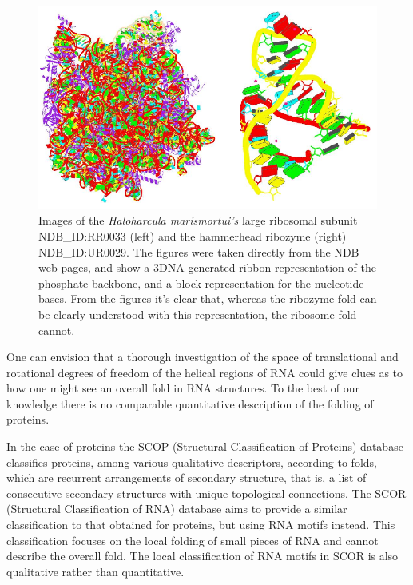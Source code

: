 \begin{figure}[t]
\centering
\includegraphics[scale=0.5]{Chapter1/ribosome_ribozyme.png}
\caption{Images   of  the  \textit{Haloharcula   marismortui's}  large
  ribosomal subunit NDB\_ID:RR0033 (left) and the hammerhead ribozyme
  (right) NDB\_ID:UR0029.
  The  figures were taken directly  from the NDB
  web  pages,   and  show  a  3DNA   generated  \cite{lu2008b}  ribbon
  representation of the phosphate backbone, and a block representation
  for the nucleotide bases. From  the figures it's clear that, whereas
  the   ribozyme   fold   can   be  clearly   understood   with   this
  representation, the ribosome fold cannot.}
\label{fig:ribosome}
\end{figure}

One  can  envision that  a  thorough  investigation  of the  space  of
translational and rotational degrees of freedom of the helical regions
of RNA could give clues as to  how one might see an overall fold in RNA
structures.  To the  best  of  our knowledge  there  is no  comparable
quantitative description of the folding of proteins.

In  the  case  of  proteins  the SCOP  (Structural  Classification  of
Proteins)  database  \cite{andreeva2004}  classifies  proteins,  among
various  qualitative  descriptors,   according  to  folds,  which  are
recurrent  arrangements of  secondary structure,  that is,  a  list of
consecutive secondary structures  with unique topological connections.
The    SCOR    (Structural    Classification    of    RNA)    database
\cite{klosterman2002,  klosterman2004}  aims   to  provide  a  similar
classification  to that obtained  for proteins,  but using  RNA motifs
instead.  This  classification focuses on  the local folding  of small
pieces  of  RNA  and  cannot  describe the  overall  fold.  The  local
classification of RNA  motifs in SCOR is also  qualitative rather than
quantitative.

